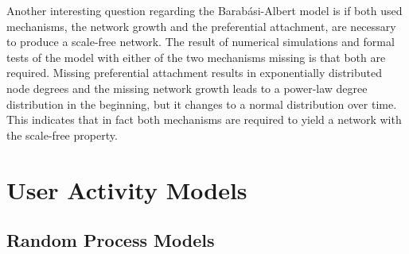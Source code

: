 Another interesting question regarding the Barabási-Albert model is if both used mechanisms, the network growth and the preferential attachment, are necessary to produce a scale-free network.
The result of numerical simulations and formal tests of the model with either of the two mechanisms missing is that both are required.
Missing preferential attachment results in exponentially distributed node degrees and the missing network growth leads to a power-law degree distribution in the beginning, but it changes to a normal distribution over time.
This indicates that in fact both mechanisms are required to yield a network with the scale-free property.




\section{User Activity Models}

\subsection{Random Process Models}

